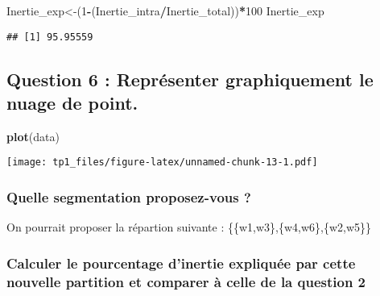 \documentclass[]{article}
\newenvironment{Shaded}{\begin{snugshade}}{\end{snugshade}}
\newcommand{\DecValTok}[1]{\textcolor[rgb]{0.00,0.00,0.81}{#1}}
\newcommand{\KeywordTok}[1]{\textcolor[rgb]{0.13,0.29,0.53}{\textbf{#1}}}
\newcommand{\NormalTok}[1]{#1}
\newcommand{\OperatorTok}[1]{\textcolor[rgb]{0.81,0.36,0.00}{\textbf{#1}}}
\begin{document}
\begin{Shaded}
\begin{Highlighting}[]
\NormalTok{Inertie_exp<-(}\DecValTok{1}\OperatorTok{-}\NormalTok{(Inertie_intra}\OperatorTok{/}\NormalTok{Inertie_total))}\OperatorTok{*}\DecValTok{100}
\NormalTok{Inertie_exp}
\end{Highlighting}
\end{Shaded}

\begin{verbatim}
## [1] 95.95559
\end{verbatim}

\hypertarget{question-6-repruxe9senter-graphiquement-le-nuage-de-point.}{%
\subsection{Question 6 : Représenter graphiquement le nuage de
point.}\label{question-6-repruxe9senter-graphiquement-le-nuage-de-point.}}

\begin{Shaded}
\begin{Highlighting}[]
\KeywordTok{plot}\NormalTok{(data)}
\end{Highlighting}
\end{Shaded}

\texttt{[image: tp1\_files/figure-latex/unnamed-chunk-13-1.pdf]}

\hypertarget{quelle-segmentation-proposez-vous}{%
\subsubsection{Quelle segmentation proposez-vous
?}\label{quelle-segmentation-proposez-vous}}

On pourrait proposer la répartion suivante :
\{\{w1,w3\},\{w4,w6\},\{w2,w5\}\}

\hypertarget{calculer-le-pourcentage-dinertie-expliquuxe9e-par-cette-nouvelle-partition-et-comparer-uxe0-celle-de-la-question-2}{%
\subsubsection{Calculer le pourcentage d'inertie expliquée par cette
nouvelle partition et comparer à celle de la question
2}\label{calculer-le-pourcentage-dinertie-expliquuxe9e-par-cette-nouvelle-partition-et-comparer-uxe0-celle-de-la-question-2}}
\end{document}

